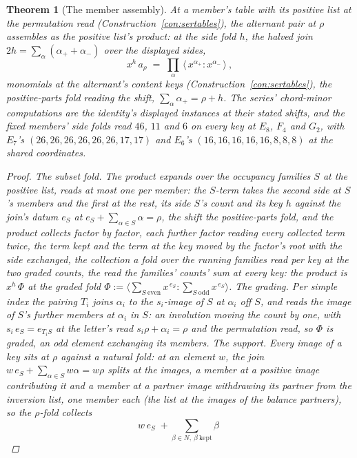 \documentclass[11pt]{article}
\newtheorem{theorem}{Theorem}
\theoremstyle{definition}
\begin{document}
\begin{theorem}[The member assembly]\label{thm:assembly}
At a member's table with its positive list at the permutation
read (Construction~\ref{con:sertables}), the alternant pair at
$\rho$ assembles as the positive list's product: at the
\emph{side fold} $h$, the halved join
$2h=\sum_\alpha(\alpha_++\alpha_-)$ over the displayed sides,
\[
x^{h}\,a_\rho\;=\;\prod_{\alpha}\,
\big\langle\,x^{\alpha_+}\!:\!x^{\alpha_-}\,\big\rangle\ ,
\]
monomials at the alternant's content keys
(Construction~\ref{con:sertables}), the positive-parts fold reading
the shift, $\sum_\alpha\alpha_+=\rho+h$. The series' chord-minor
computations are the identity's displayed instances at their
stated shifts, and the fixed members' side folds read $46$, $11$
and $6$ on every key at $E_8$, $F_4$ and $G_2$, with $E_7$'s
$(26,26,26,26,26,26,17,17)$ and $E_6$'s $(16,16,16,16,16,8,8,8)$
at the shared coordinates.
\begin{proof}
\emph{The subset fold.} The product expands over the occupancy
families $S$ at the positive list, reads at most one per member:
the $S$-term takes the second side at $S$'s members and the
first at the rest, its side $S$'s count and its key $h$ against
the join's datum $e_S$ at $e_S+\sum_{\alpha\in S}\alpha=\rho$,
the shift the positive-parts fold, and the product collects
factor by factor, each further factor reading every collected
term twice, the term kept and the term at the key moved by the
factor's root with the side exchanged, the collection a fold over
the running families read per key at the two graded counts, the
read the families' counts' sum at every key: the product is
$x^{h}\,\Phi$
at the graded fold
$\Phi:=\big\langle\sum_{S\ \mathrm{even}}x^{\,e_S}:
\sum_{S\ \mathrm{odd}}x^{\,e_S}\big\rangle$.
\emph{The grading.} Per simple index the pairing $T_i$ joins
$\alpha_i$ to the $s_i$-image of $S$ at $\alpha_i$ off $S$, and
reads the image of $S$'s further members at $\alpha_i$ in $S$:
an involution moving the count by one, with
$s_i\,e_S=e_{T_iS}$ at the letter's read $s_i\rho+\alpha_i=\rho$
and the permutation read, so $\Phi$ is graded, an odd element
exchanging its members.
\emph{The support.} Every image of a key sits at $\rho$ against
a natural fold: at an element $w$, the join
$w\,e_S+\sum_{\alpha\in S}w\alpha=w\rho$ splits at the images, a
member at a positive image contributing it and a member at a
partner image withdrawing its partner from the inversion list,
one member each (the list at the images of the
balance partners), so the $\rho$-fold collects
\[
w\,e_S\;+\sum_{\beta\in N,\ \beta\ \mathrm{kept}}\beta\;
\]
\end{proof}
\end{theorem}
\end{document}
